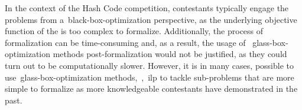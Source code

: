 In the context of the Hash Code competition, contestants typically engage the
problems from a~\acrshort{black-box-optimization} perspective, as the underlying
objective function of the is too complex to formalize. Additionally, the process
of formalization can be time-consuming and, as a result, the usage of
~\acrshort{glass-box-optimization} methods post-formalization would not be
justified, as they could turn out to be computationally slower. However, it is
in many cases, possible to use~\acrshort{glass-box-optimization}
methods,~\eg{},~\acrshort{ilp} to tackle sub-problems that are more simple to
formalize as more knowledgeable contestants have demonstrated in the past.
